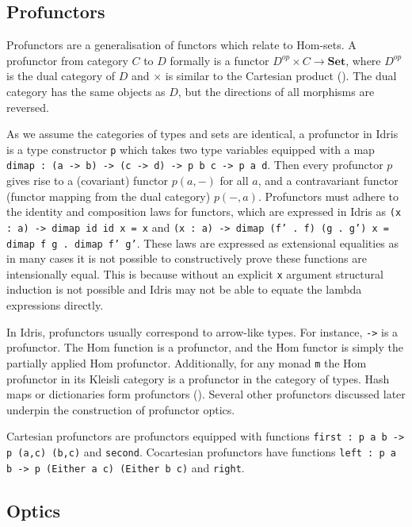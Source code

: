 \documentclass[11pt]{report}
\begin{document}
\begin{spacing}{1.15}
\subsection{Profunctors}

Profunctors are a generalisation of functors which relate to Hom-sets. A profunctor from category $C$ to $D$ formally is a functor $D^{op}\times C\to\mathbf{Set}$, where $D^{op}$ is the dual category of $D$ and $\times$ is similar to the Cartesian product (\cite{nlab:profunctor}). The dual category has the same objects as $D$, but the directions of all morphisms are reversed.

As we assume the categories of types and sets are identical, a profunctor in Idris is a type constructor \texttt{p} which takes two type variables equipped with a map \texttt{dimap : (a -> b) -> (c -> d) -> p b c -> p a d}. Then every profunctor $p$ gives rise to a (covariant) functor $p(a,-)$ for all $a$, and a contravariant functor (functor mapping from the dual category) $p(-,a)$. Profunctors must adhere to the identity and composition laws for functors, which are expressed in Idris as \texttt{(x : a) -> dimap id id x = x} and \texttt{(x : a) -> dimap (f' . f) (g . g') x = dimap f g . dimap f' g'}. These laws are expressed as extensional equalities as in many cases it is not possible to constructively prove these functions are intensionally equal. This is because without an explicit \texttt{x} argument structural induction is not possible and Idris may not be able to equate the lambda expressions directly.

In Idris, profunctors usually correspond to arrow-like types. For instance, \texttt{->} is a profunctor. The Hom function is a profunctor, and the Hom functor is simply the partially applied Hom profunctor. Additionally, for any monad \texttt{m} the Hom profunctor in its Kleisli category is a profunctor in the category of types. Hash maps or dictionaries form profunctors (\cite{milewskicoends}). Several other profunctors discussed later underpin the construction of profunctor optics.

Cartesian profunctors are profunctors equipped with functions \texttt{first : p a b -> p (a,c) (b,c)} and \texttt{second}. Cocartesian profunctors have functions \texttt{left : p a b -> p (Either a c) (Either b c)} and \texttt{right}.

\subsection{Optics}


\end{spacing}
\end{document}

